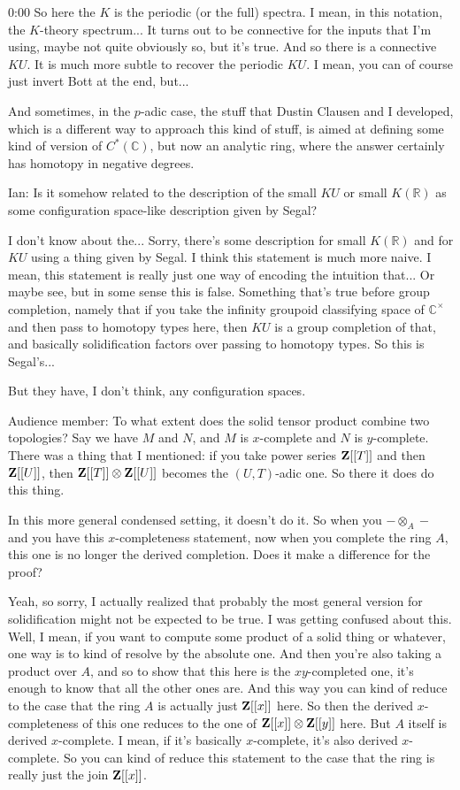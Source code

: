 \begin{unfinished}{0:00}
So here the $K$ is the periodic (or the full) spectra. I mean, in this notation, the $K$-theory spectrum... It turns out to be connective for the inputs that I'm using, maybe not quite obviously so, but it's true. And so there is a connective $KU$. It is much more subtle to recover the periodic $KU$. I mean, you can of course just invert Bott at the end, but...

And sometimes, in the $p$-adic case, the stuff that Dustin Clausen and I developed, which is a different way to approach this kind of stuff, is aimed at defining some kind of version of $C^*(\mathbb{C})$, but now an analytic ring, where the answer certainly has homotopy in negative degrees.

Ian: Is it somehow related to the description of the small $KU$ or small $K(\mathbb{R})$ as some configuration space-like description given by Segal?

I don't know about the... Sorry, there's some description for small $K(\mathbb{R})$ and for $KU$ using a thing given by Segal. I think this statement is much more naive. I mean, this statement is really just one way of encoding the intuition that... Or maybe see, but in some sense this is false. Something that's true before group completion, namely that if you take the infinity groupoid classifying space of $\mathbb{C}^\times$ and then pass to homotopy types here, then $KU$ is a group completion of that, and basically solidification factors over passing to homotopy types. So this is Segal's...

But they have, I don't think, any configuration spaces.

Audience member: To what extent does the solid tensor product combine two topologies? Say we have $M$ and $N$, and $M$ is $x$-complete and $N$ is $y$-complete. There was a thing that I mentioned: if you take power series $\mathbf Z[[T]]$ and then $\mathbf Z[[U]]$, then $\mathbf Z[[T]] \otimes \mathbf Z[[U]]$ becomes the $(U,T)$-adic one. So there it does do this thing.

In this more general condensed setting, it doesn't do it. So when you $-\otimes_A-$ and you have this $x$-completeness statement, now when you complete the ring $A$, this one is no longer the derived completion. Does it make a difference for the proof?

Yeah, so sorry, I actually realized that probably the most general version for solidification might not be expected to be true. I was getting confused about this. Well, I mean, if you want to compute some product of a solid thing or whatever, one way is to kind of resolve by the absolute one. And then you're also taking a product over $A$, and so to show that this here is the $xy$-completed one, it's enough to know that all the other ones are. And this way you can kind of reduce to the case that the ring $A$ is actually just $\mathbf Z[[x]]$ here. So then the derived $x$-completeness of this one reduces to the one of $\mathbf Z[[x]] \otimes \mathbf Z[[y]]$ here. But $A$ itself is derived $x$-complete. I mean, if it's basically $x$-complete, it's also derived $x$-complete. So you can kind of reduce this statement to the case that the ring is really just the join $\mathbf Z[[x]]$.


\end{unfinished}
